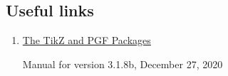 \subsection{Useful links}

\begin{enumerate}

    \item \href{https://mirror.foobar.to/CTAN/graphics/pgf/base/doc/pgfmanual.pdf}{The TikZ and PGF Packages}
    
        Manual for version 3.1.8b, December 27, 2020
    
\end{enumerate}